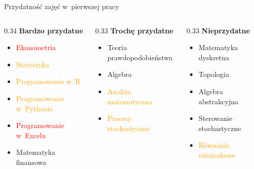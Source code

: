 \documentclass{beamer}
\begin{document}
\begin{frame}{Przydatność zajęć w~pierwszej pracy}
  \small
  \begin{columns}[T]
    \begin{column}{0.34\textwidth}
      \textbf{Bardzo przydatne}
      \begin{itemize}
        \item \textcolor{red}{Ekonometria}
        \item \textcolor{orange}{Statystyka}
        \item \textcolor{orange}{Programowanie w~R}
        \item \textcolor{orange}{Programowanie w~Pythonie}
        \item \textcolor{red}{Programowanie w~Excelu}
        \item \textcolor{green!70!black}{Matematyka finansowa}
      \end{itemize}
    \end{column}
    \begin{column}{0.33\textwidth}
      \textbf{Trochę przydatne}
      \begin{itemize}
        \item \textcolor{green!70!black}{Teoria prawdopodobieństwa}
        \item \textcolor{green!70!black}{Algebra}
        \item \textcolor{orange}{Analiza matematyczna}
        \item \textcolor{orange}{Procesy stochastyczne}
      \end{itemize}
    \end{column}
    \begin{column}{0.33\textwidth}
      \textbf{Nieprzydatne}
      \begin{itemize}
        \item \textcolor{green!70!black}{Matematyka dyskretna}
        \item \textcolor{green!70!black}{Topologia}
        \item \textcolor{green!70!black}{Algebra abstrakcyjna}
        \item \textcolor{green!70!black}{Sterowanie stochastyczne}
        \item \textcolor{orange}{Równania różniczkowe}
      \end{itemize}
    \end{column}
  \end{columns}
\end{frame}
\end{document}
